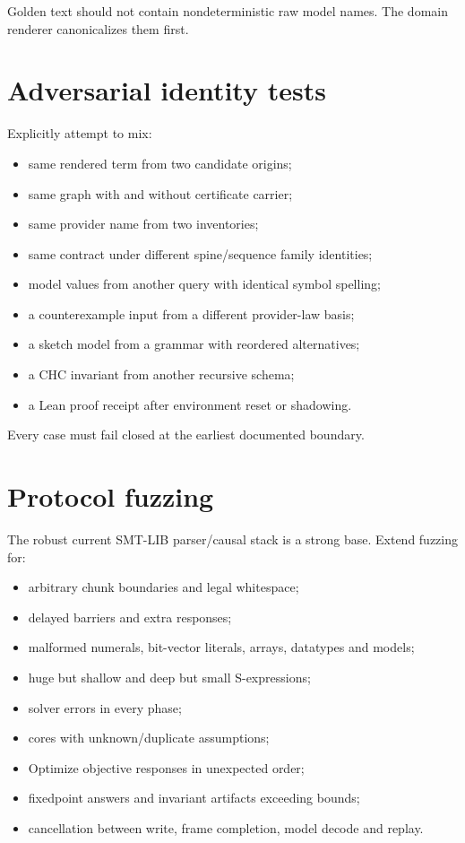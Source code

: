 \documentclass[11pt,oneside]{report}
\begin{document}
Golden text should not contain nondeterministic raw model names. The domain renderer canonicalizes them first.

\section{Adversarial identity tests}

Explicitly attempt to mix:

\begin{itemize}[leftmargin=2em]
\item same rendered term from two candidate origins;
\item same graph with and without certificate carrier;
\item same provider name from two inventories;
\item same contract under different spine/sequence family identities;
\item model values from another query with identical symbol spelling;
\item a counterexample input from a different provider-law basis;
\item a sketch model from a grammar with reordered alternatives;
\item a CHC invariant from another recursive schema;
\item a Lean proof receipt after environment reset or shadowing.
\end{itemize}

Every case must fail closed at the earliest documented boundary.

\section{Protocol fuzzing}

The robust current SMT-LIB parser/causal stack is a strong base. Extend fuzzing for:

\begin{itemize}[leftmargin=2em]
\item arbitrary chunk boundaries and legal whitespace;
\item delayed barriers and extra responses;
\item malformed numerals, bit-vector literals, arrays, datatypes and models;
\item huge but shallow and deep but small S-expressions;
\item solver errors in every phase;
\item cores with unknown/duplicate assumptions;
\item Optimize objective responses in unexpected order;
\item fixedpoint answers and invariant artifacts exceeding bounds;
\item cancellation between write, frame completion, model decode and replay.
\end{itemize}
\end{document}
